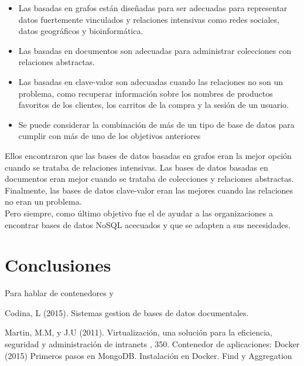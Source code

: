 \documentclass[twoside,twocolumn]{article}
\begin{document}
\begin{itemize}	
	\item Las basadas en grafos están diseñadas para ser adecuadas para representar datos fuertemente vinculados y relaciones intensivas como redes sociales, datos geográficos y bioinformática.
	\item Las basadas en documentos son adecuadas para administrar colecciones con relaciones abstractas.
	\item Las basadas en clave-valor son adecuadas cuando las relaciones no son un problema, como recuperar información sobre los nombres de productos favoritos de los clientes, los carritos de la compra y la sesión de un usuario.
	\item Se puede considerar la combinación de más de un tipo de base de datos para cumplir con más de uno de los objetivos anteriores
\end{itemize}

Ellos encontraron que las bases de datos basadas en grafos eran la mejor opción cuando se trataba de relaciones intensivas. Las bases de datos basadas en documentos eran mejor cuando se trataba de colecciones y relaciones abstractas. Finalmente, las bases de datos clave-valor eran las mejores cuando las relaciones no eran un problema. \\
Pero siempre, como último objetivo fue el de ayudar a las organizaciones a encontrar bases de datos NoSQL acecuados y que se adapten a sus necesidades. 

\section{Conclusiones}

Para hablar de contenedores y

\begin{thebibliography}{99} %
Codina, L (2015).
\newblock Sistemas gestion de bases de datos documentales.


Martin, M.M,  y J.U (2011).
\newblock Virtualización, una solución para la eficiencia,
seguridad y administración de intranets
, 350.
\newblock Contenedor de aplicaciones: Docker (2015)
\newblock Primeros pasos en MongoDB. Instalación en Docker. Find y Aggregation
 
 
\end{thebibliography}

\end{document}
